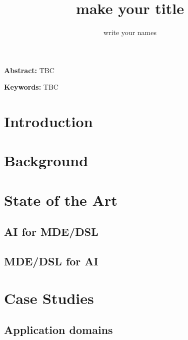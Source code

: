 \documentclass[11pt, oneside]{article}   	%
\title{\bf make your title}
\author{write your names}
\date{}							%
\begin{document}
\maketitle

{\noindent\small{\bf Abstract:} TBC}

\vspace{1ex}
{\noindent\small{\bf Keywords:}
   TBC}



\section{Introduction}


\section{Background}




\section{State of the Art}
\subsection{AI for MDE/DSL}


\subsection{MDE/DSL for AI}





\section{Case Studies}


\subsection{Application domains}
\end{document}
